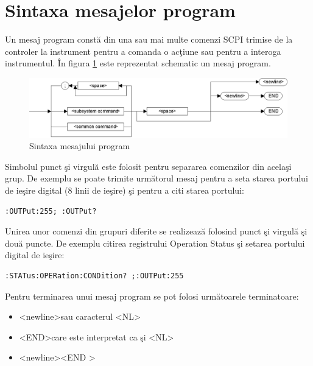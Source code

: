 \section{Sintaxa mesajelor program}
Un mesaj program const\u{a} din una sau mai multe comenzi SCPI trimise de la controler la instrument pentru a comanda o ac\c{t}iune sau pentru a interoga instrumentul. \^{I}n figura \ref{fig1} este reprezentat schematic un mesaj program.

\begin{figure}[htp]
 \centering
 \includegraphics[scale=0.7]{Figuri/fig1_scpi_meas.eps}
 \caption{Sintaxa mesajului program}
 \label{fig1}
\end{figure}

Simbolul punct \c{s}i virgul\u{a} este folosit pentru separarea comenzilor din acela\c{s}i grup. De exemplu se poate trimite urm\u{a}torul mesaj pentru a seta starea portului de ie\c{s}ire digital (8 linii de ie\c{s}ire) \c{s}i pentru a citi starea portului:

\begin{center}
\begin{verbatim}
:OUTPut:255; :OUTPut?
\end{verbatim}
\end{center}

Unirea unor comenzi din grupuri diferite se realizeaz\u{a} folosind punct \c{s}i virgul\u{a} \c{s}i dou\u{a} puncte. De exemplu citirea registrului Operation Status \c{s}i setarea portului digital de ie\c{s}ire:

\begin{center}
\begin{verbatim}
:STATus:OPERation:CONDition? ;:OUTPut:255
\end{verbatim}
\end{center}

Pentru terminarea unui mesaj program se pot folosi urm\u{a}toarele terminatoare:
\begin{itemize}
	\item \textless  newline\textgreater sau caracterul \textless  NL\textgreater
	\item \textless  END\textgreater care este interpretat ca \c{s}i \textless  NL\textgreater
	\item \textless  newline\textgreater\textless  END \textgreater
\end{itemize}

